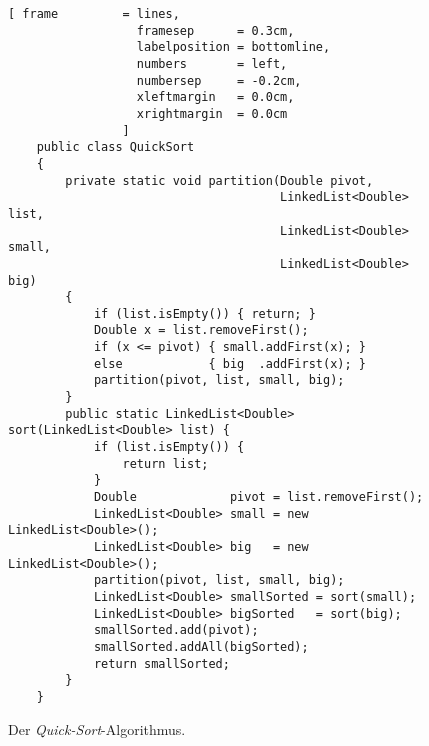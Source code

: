 \begin{figure}[!ht]
  \centering
\begin{Verbatim}[ frame         = lines, 
                  framesep      = 0.3cm, 
                  labelposition = bottomline,
                  numbers       = left,
                  numbersep     = -0.2cm,
                  xleftmargin   = 0.0cm,
                  xrightmargin  = 0.0cm
                ]
    public class QuickSort
    {  
        private static void partition(Double pivot, 
                                      LinkedList<Double> list,
                                      LinkedList<Double> small, 
                                      LinkedList<Double> big) 
        {
            if (list.isEmpty()) { return; }
            Double x = list.removeFirst();
            if (x <= pivot) { small.addFirst(x); } 
            else            { big  .addFirst(x); }
            partition(pivot, list, small, big);
        }
        public static LinkedList<Double> sort(LinkedList<Double> list) {
            if (list.isEmpty()) {
                return list;
            }
            Double             pivot = list.removeFirst();
            LinkedList<Double> small = new LinkedList<Double>();
            LinkedList<Double> big   = new LinkedList<Double>();
            partition(pivot, list, small, big);
            LinkedList<Double> smallSorted = sort(small);
            LinkedList<Double> bigSorted   = sort(big);
            smallSorted.add(pivot);
            smallSorted.addAll(bigSorted);
            return smallSorted;
        }    
    }
\end{Verbatim}
\vspace*{-0.3cm}
  \caption{Der \emph{Quick-Sort}-Algorithmus.}
  \label{fig:quick-sort}
\end{figure}

